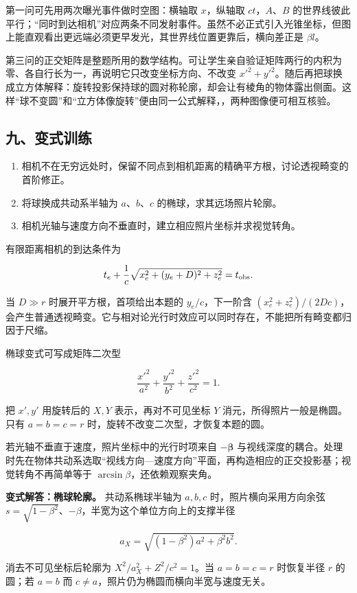 \documentclass[12pt,a4paper,UTF8]{ctexart}
\newcommand{\tightlist}{\setlength{\itemsep}{0pt}\setlength{\parskip}{0pt}}
\begin{document}
第一问可先用两次曝光事件做时空图：横轴取 \(x\)，纵轴取
\(ct\)，\(A\)、\(B\)
的世界线彼此平行；``同时到达相机''对应两条不同发射事件。虽然不必正式引入光锥坐标，但图上能直观看出更远端必须更早发光，其世界线位置更靠后，横向差正是
\(\beta l\)。

第三问的正交矩阵是整题所用的数学结构。可让学生亲自验证矩阵两行的内积为零、各自行长为一，再说明它只改变坐标方向、不改变
\(x'^2+y'^2\)。随后再把球换成立方体解释：旋转投影保持球的圆对称轮廓，却会让有棱角的物体露出侧面。这样``球不变圆''和``立方体像旋转''便由同一公式解释，，两种图像便可相互核验。

\subsection{九、变式训练}\label{ux4e5dux53d8ux5f0fux8badux7ec3-7}

\begin{enumerate}
\def\labelenumi{\arabic{enumi}.}
\tightlist
\item
  相机不在无穷远处时，保留不同点到相机距离的精确平方根，讨论透视畸变的首阶修正。
\item
  将球换成共动系半轴为 \(a\)、\(b\)、\(c\) 的椭球，求其远场照片轮廓。
\item
  相机光轴与速度方向不垂直时，建立相应照片坐标并求视觉转角。
\end{enumerate}

有限距离相机的到达条件为

\[t_e+\frac1c\sqrt{x_e^2+(y_e+D)^2+z_e^2}=t_{\rm obs}.\]

当 \(D\gg r\) 时展开平方根，首项给出本题的 \(y_e/c\)，下一阶含
\((x_e^2+z_e^2)/(2Dc)\)，会产生普通透视畸变。它与相对论光行时效应可以同时存在，不能把所有畸变都归因于尺缩。

椭球变式可写成矩阵二次型

\[\frac{x'^2}{a^2}+\frac{y'^2}{b^2}+\frac{z'^2}{c^2}=1.\]

把 \(x',y'\) 用旋转后的 \(X,Y\) 表示，再对不可见坐标 \(Y\)
消元，所得照片一般是椭圆。只有 \(a=b=c=r\)
时，旋转不改变二次型，才恢复本题的圆。

若光轴不垂直于速度，照片坐标中的光行时项来自 \(-\bm\beta\)
与视线深度的耦合。处理时先在物体共动系选取``视线方向---速度方向''平面，再构造相应的正交投影基；视觉转角不再简单等于
\(\arcsin\beta\)，还依赖观察夹角。

\textbf{变式解答：椭球轮廓。} 共动系椭球半轴为 \(a,b,c\)
时，照片横向采用方向余弦
\(s=\sqrt{1-\beta^2}\)、\(-\beta\)，半宽为这个单位方向上的支撑半径

\[a_X=\sqrt{(1-\beta^2)a^2+\beta^2b^2}.\]

消去不可见坐标后轮廓为 \(X^2/a_X^2+Z^2/c^2=1\)。当 \(a=b=c=r\)
时恢复半径 \(r\) 的圆；若 \(a=b\) 而
\(c\ne a\)，照片仍为椭圆而横向半宽与速度无关。
\end{document}
